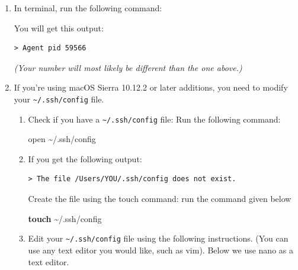 \documentclass[
]{book}
\newenvironment{Shaded}{\begin{snugshade}}{\end{snugshade}}
\newcommand{\AttributeTok}[1]{\textcolor[rgb]{0.13,0.29,0.53}{#1}}
\newcommand{\BuiltInTok}[1]{#1}
\newcommand{\ExtensionTok}[1]{#1}
\newcommand{\FunctionTok}[1]{\textcolor[rgb]{0.13,0.29,0.53}{\textbf{#1}}}
\newcommand{\NormalTok}[1]{#1}
\newcommand{\StringTok}[1]{\textcolor[rgb]{0.31,0.60,0.02}{#1}}
\newcommand{\VariableTok}[1]{\textcolor[rgb]{0.00,0.00,0.00}{#1}}
\theoremstyle{definition}
\theoremstyle{definition}
\theoremstyle{definition}
\theoremstyle{definition}
\theoremstyle{remark}
\begin{document}
\begin{enumerate}
\def\labelenumi{\arabic{enumi}.}
\item
  In terminal, run the following command:

\begin{Shaded}
\end{Shaded}

  You will get this output:

\begin{verbatim}
> Agent pid 59566
\end{verbatim}

  \emph{(Your number will most likely be different than the one above.)}
\item
  If you're using macOS Sierra 10.12.2 or later additions, you need to modify your \texttt{\textasciitilde{}/.ssh/config} file.

  \begin{enumerate}
  \def\labelenumii{\arabic{enumii}.}
  \item
    Check if you have a \texttt{\textasciitilde{}/.ssh/config} file: Run the following command:

\begin{Shaded}
\begin{Highlighting}[]
\ExtensionTok{open}\NormalTok{ \textasciitilde{}/.ssh/config}
\end{Highlighting}
\end{Shaded}
  \item
    If you get the following output:

\begin{verbatim}
> The file /Users/YOU/.ssh/config does not exist.
\end{verbatim}

    Create the file using the touch command: run the command given below

\begin{Shaded}
\begin{Highlighting}[]
\FunctionTok{touch}\NormalTok{ \textasciitilde{}/.ssh/config}
\end{Highlighting}
\end{Shaded}
  \item
    Edit your \texttt{\textasciitilde{}/.ssh/config} file using the following instructions. (You can use any text editor you would like, such as vim). Below we use nano as a text editor.


\end{enumerate}
\end{enumerate}
\end{document}
